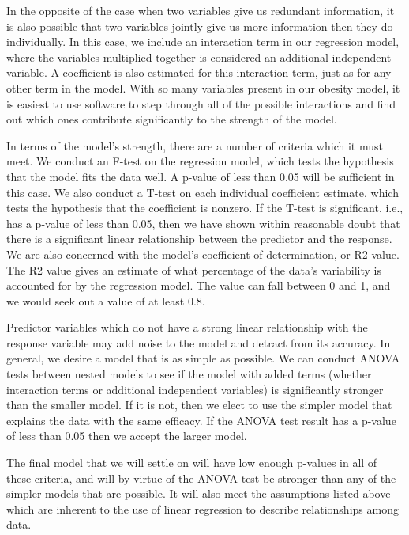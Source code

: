 \documentclass[oneside,12pt]{report}
\begin{document}
In the opposite of the case when two variables give us redundant information, it is also possible that two variables jointly give us more information then they do individually. In this case, we include an interaction term in our regression model, where the variables multiplied together is considered an additional independent variable. A coefficient is also estimated for this interaction term, just as for any other term in the model. With so many variables present in our obesity model, it is easiest to use software to step through all of the possible interactions and find out which ones contribute significantly to the strength of the model.

In terms of the model's strength, there are a number of criteria which it must meet. We conduct an F-test on the regression model, which tests the hypothesis that the model fits the data well. A p-value of less than 0.05 will be sufficient in this case. We also conduct a T-test on each individual coefficient estimate, which tests the hypothesis that the coefficient is nonzero. If the T-test is significant, i.e., has a p-value of less than 0.05, then we have shown within reasonable doubt that there is a significant linear relationship between the predictor and the response. We are also concerned with the model's coefficient of determination, or R2 value. The R2 value gives an estimate of what percentage of the data's variability is accounted for by the regression model. The value can fall between 0 and 1, and we would seek out a value of at least 0.8.

Predictor variables which do not have a strong linear relationship with the response variable may add noise to the model and detract from its accuracy. In general, we desire a model that is as simple as possible. We can conduct ANOVA tests between nested models to see if the model with added terms (whether interaction terms or additional independent variables) is significantly stronger than the smaller model. If it is not, then we elect to use the simpler model that explains the data with the same efficacy. If the ANOVA test result has a p-value of less than 0.05 then we accept the larger model.

The final model that we will settle on will have low enough p-values in all of these criteria, and will by virtue of the ANOVA test be stronger than any of the simpler models that are possible. It will also meet the assumptions listed above which are inherent to the use of linear regression to describe relationships among data.
\end{document}
